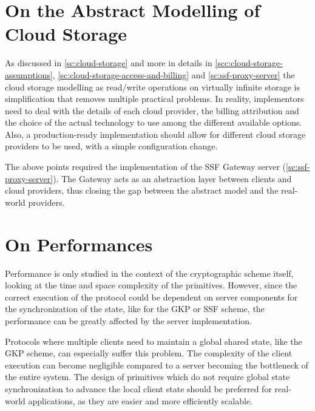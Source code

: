 \section{On the Abstract Modelling of Cloud Storage}\label{sc:gap-abstract-cloud-storage}

As discussed in \cref{sc:cloud-storage} and more in details in 
\cref{scc:cloud-storage-assumptions},
\cref{sc:cloud-storage-access-and-billing}
and \cref{sc:ssf-proxy-server} the cloud storage modelling
as read/write operations on virtually infinite storage
is simplification that removes multiple practical problems. 
In reality, implementors need to
deal with the details of each cloud provider, the billing attribution
and the choice of the actual technology to use among
the different available options.
Also, a production-ready
implementation should allow for different cloud storage
providers to be used, with a simple configuration change.

The above points required the implementation of the
SSF Gateway server (\cref{sc:ssf-proxy-server}).
The Gateway acts as an abstraction layer between clients
and cloud providers, thus closing the gap
between the abstract model and the real-world providers.

\section{On Performances}\label{sc:gap-performance}

Performance is only studied in the context of the
cryptographic scheme itself, looking at the time and
space complexity of the primitives.
However, since the correct execution of the protocol
could be dependent on server components for the synchronization
of the state, like for the GKP or SSF scheme, the performance
can be greatly affected by the server implementation.

Protocols where multiple clients need to maintain
a global shared state, like the GKP scheme, can especially
suffer this problem. The complexity of the client
execution can become negligible compared to a server
becoming the bottleneck of the entire system.
The design of primitives which do not require 
global state synchronization to advance the local
client state should be preferred
for real-world applications, as they are easier 
and more efficiently scalable.




